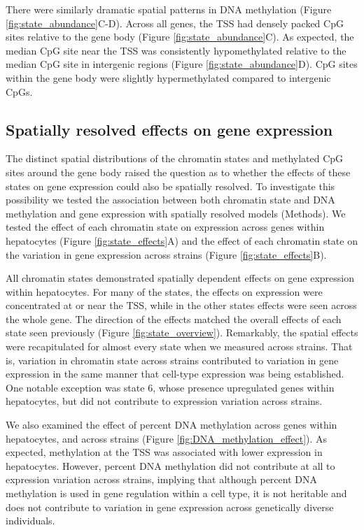 \documentclass[10pt,letterpaper]{article}
\begin{document}
There were similarly dramatic spatial patterns in DNA methylation
(Figure \ref{fig:state_abundance}C-D). Across all genes, the TSS had
densely packed CpG sites relative to the gene body (Figure
\ref{fig:state_abundance}C). As expected, the median CpG site near the
TSS was consistently hypomethylated relative to the median CpG site in
intergenic regions (Figure \ref{fig:state_abundance}D). CpG sites within
the gene body were slightly hypermethylated compared to intergenic CpGs.

\hypertarget{spatially-resolved-effects-on-gene-expression}{%
\subsection{Spatially resolved effects on gene
expression}\label{spatially-resolved-effects-on-gene-expression}}

The distinct spatial distributions of the chromatin states and
methylated CpG sites around the gene body raised the question as to
whether the effects of these states on gene expression could also be
spatially resolved. To investigate this possibility we tested the
association between both chromatin state and DNA methylation and gene
expression with spatially resolved models (Methods). We tested the
effect of each chromatin state on expression across genes within
hepatocytes (Figure \ref{fig:state_effects}A) and the effect of each
chromatin state on the variation in gene expression across strains
(Figure \ref{fig:state_effects}B).

All chromatin states demonstrated spatially dependent effects on gene
expression within hepatocytes. For many of the states, the effects on
expression were concentrated at or near the TSS, while in the other
states effects were seen across the whole gene. The direction of the
effects matched the overall effects of each state seen previously
(Figure \ref{fig:state_overview}). Remarkably, the spatial effects were
recapitulated for almost every state when we measured across strains.
That is, variation in chromatin state across strains contributed to
variation in gene expression in the same manner that cell-type
expression was being established. One notable exception was state 6,
whose presence upregulated genes within hepatocytes, but did not
contribute to expression variation across strains.

We also examined the effect of percent DNA methylation across genes
within hepatocytes, and across strains (Figure
\ref{fig:DNA_methylation_effect}). As expected, methylation at the TSS
was associated with lower expression in hepatocytes. However, percent
DNA methylation did not contribute at all to expression variation across
strains, implying that although percent DNA methylation is used in gene
regulation within a cell type, it is not heritable and does not
contribute to variation in gene expression across genetically diverse
individuals.
\end{document}
